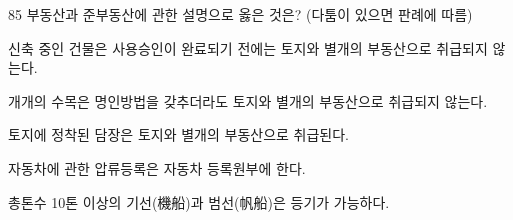 \begin{question}{85}
부동산과 준부동산에 관한 설명으로 옳은 것은? (다툼이 있으면 판례에 따름)
\begin{choices}
  \item 신축 중인 건물은 사용승인이 완료되기 전에는 토지와 별개의 부동산으로 취급되지 않는다.
  \item 개개의 수목은 명인방법을 갖추더라도 토지와 별개의 부동산으로 취급되지 않는다.
  \item 토지에 정착된 담장은 토지와 별개의 부동산으로 취급된다.
  \item 자동차에 관한 압류등록은 자동차 등록원부에 한다.
  \item 총톤수 10톤 이상의 기선(機船)과 범선(帆船)은 등기가 가능하다.
\end{choices}
\end{question}
